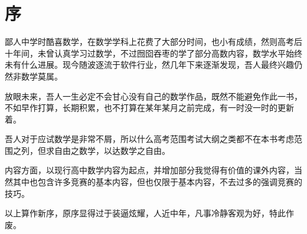 
\chapter*{序}

鄙人中学时酷喜数学，在数学学科上花费了大部分时间，也小有成绩，然则高考后十年间，未曾认真学习过数学，不过囫囵吞枣的学了部分高数内容，数学水平始终未有什么进展。现今随波逐流于软件行业，然几年下来逐渐发现，吾人最终兴趣仍然非数学莫属。

放眼未来，吾人一生必定不会甘心没有自己的数学作品，既然不能避免作此一书，不如早作打算，长期积累，也不打算在某年某月之前完成，有一时没一时的更新着。

吾人对于应试数学是非常不屑，所以什么高考范围考试大纲之类都不在本书考虑范围之列，但求自由之数学，以达数学之自由。

内容方面，以现行高中数学内容为起点，并增加部分我觉得有价值的课外内容，当然其中也包含许多竞赛的基本内容，但也仅限于基本内容，不去过多的强调竞赛的技巧。

以上算作新序，原序显得过于装逼炫耀，人近中年，凡事冷静客观为好，特此作废。


